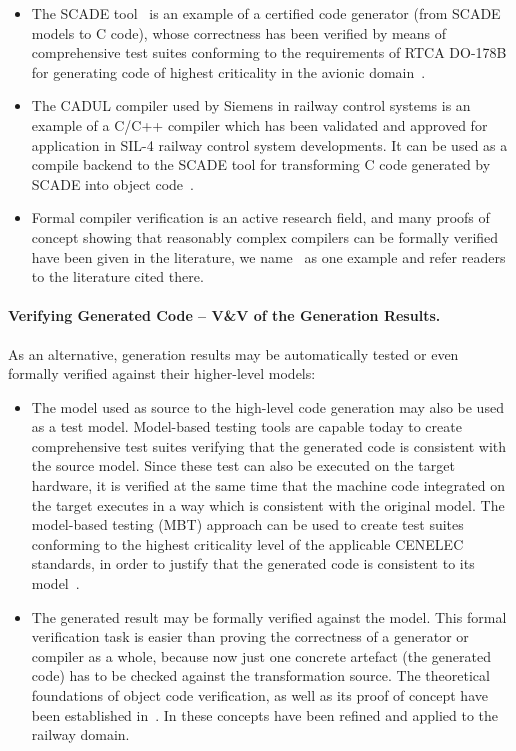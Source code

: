 \documentclass[11pt, a4paper]{article}
\begin{document}
\begin{itemize}
\item The SCADE tool~\cite{scade} is an example of a certified code generator (from SCADE models to C code), whose correctness has been verified by means of comprehensive test suites conforming to the requirements of RTCA DO-178B for generating code of highest criticality in the avionic domain~\cite{do178b}.

\item  The CADUL compiler used by Siemens in railway control systems is an example of a C/C++ compiler which has been validated and approved for application in SIL-4 railway control system developments. It can be used as a compile backend to the SCADE tool for transforming C code generated by SCADE into object code~\cite{cadul}.

\item  Formal compiler verification is an active research field, and many proofs of concept showing that reasonably complex compilers can be formally verified have been given in the literature, we name~\cite{Leroy_formalverification} as one example and refer readers to the literature cited there. 
\end{itemize}


\paragraph{Verifying Generated Code -- V\&V of the Generation Results.}
As an alternative, generation results may be automatically tested or even formally verified 
against their higher-level models: 
\begin{itemize}
\item The model used as source to the high-level code generation may also be used as a test model. Model-based testing tools are capable today to create comprehensive test suites verifying that the generated code is consistent with the source model. Since these test can also be executed on the target hardware, it is verified at the same time that the machine code integrated on the target executes in a way which is consistent with the original model. The model-based testing (MBT) approach can be used to create test suites conforming to the highest criticality level of the 
applicable CENELEC standards, in order to justify that the generated code is consistent to its model~\cite{PeleskaVL11Nfm,pel2011a,peleska2009d}.

\item  
The generated result may be formally verified against the model. This formal verification task is easier than proving the correctness of a generator or compiler as a whole, because now just one concrete artefact (the generated code) has to be checked against the transformation source. The theoretical foundations of object code verification, as well as its proof of concept have been established in~\cite{Pnueli98}. In 
\cite{RSRSChapter2012,DBLP:journals/fac/HaxthausenPK11} these concepts have been refined and applied to the railway domain.
\end{itemize}
\end{document}

